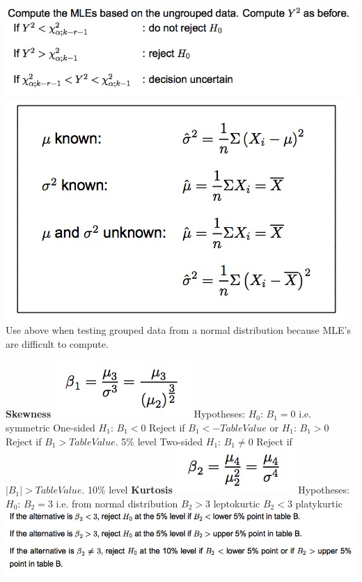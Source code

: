 \documentclass{examnotes}
\begin{document}
\includegraphics[scale=0.45]{./img/normaltest.jpg}
\includegraphics[scale=0.45]{./img/normals.jpg}
Use above when testing grouped data from a normal distribution because MLE's are difficult to compute.

{\bf Skewness}
\includegraphics[scale=0.6]{./img/b1.jpg}
Hypotheses:
$H_0$: $B_1=0$ i.e. symmetric
\ra One-sided $H_1$: $B_1<0$ Reject if $B_1 < -TableValue$ or $H_1$: $B_1>0$ Reject if $B_1>  TableValue$. 5\% level
\ra Two-sided $H_1$: $B_1\ne0$ Reject if $|B_1| > TableValue$. 10\% level 
\vspace{6pt}
{\bf Kurtosis} 
\includegraphics[scale=0.6]{./img/b2.jpg}
Hypotheses:
$H_0$: $B_2=3$ i.e. from normal distribution
$B_2>3$ leptokurtic
$B_2<3$ platykurtic
\vspace{6pt}
\hspace{-5pt}\includegraphics[scale=0.5]{./img/b2tests.jpg}
\end{document}
